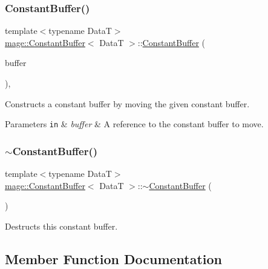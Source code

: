 \subsubsection{\texorpdfstring{Constant\+Buffer()}{ConstantBuffer()}\hspace{0.1cm}{\footnotesize\ttfamily [4/4]}}
{\footnotesize\ttfamily template$<$typename DataT$>$ \\
\hyperlink{classmage_1_1_constant_buffer}{mage\+::\+Constant\+Buffer}$<$ DataT $>$\+::\hyperlink{classmage_1_1_constant_buffer}{Constant\+Buffer} (\begin{DoxyParamCaption}\item[{\hyperlink{classmage_1_1_constant_buffer}{Constant\+Buffer}$<$ DataT $>$ \&\&}]{buffer }\end{DoxyParamCaption})\hspace{0.3cm}{\ttfamily [default]}, {\ttfamily [noexcept]}}

Constructs a constant buffer by moving the given constant buffer.


\begin{DoxyParams}[1]{Parameters}
\mbox{\tt in}  & {\em buffer} & A reference to the constant buffer to move. \\
\hline
\end{DoxyParams}
\hypertarget{classmage_1_1_constant_buffer_a874e9507ea3b6d2f630f061c2fc6d2d0}{}\label{classmage_1_1_constant_buffer_a874e9507ea3b6d2f630f061c2fc6d2d0} 
\subsubsection{\texorpdfstring{$\sim$\+Constant\+Buffer()}{~ConstantBuffer()}}
{\footnotesize\ttfamily template$<$typename DataT$>$ \\
\hyperlink{classmage_1_1_constant_buffer}{mage\+::\+Constant\+Buffer}$<$ DataT $>$\+::$\sim$\hyperlink{classmage_1_1_constant_buffer}{Constant\+Buffer} (\begin{DoxyParamCaption}{ }\end{DoxyParamCaption})\hspace{0.3cm}{\ttfamily [default]}}

Destructs this constant buffer. 

\subsection{Member Function Documentation}
\hypertarget{classmage_1_1_constant_buffer_a7592eed823334cdc3da614121f2b25ca}{}\label{classmage_1_1_constant_buffer_a7592eed823334cdc3da614121f2b25ca} 
